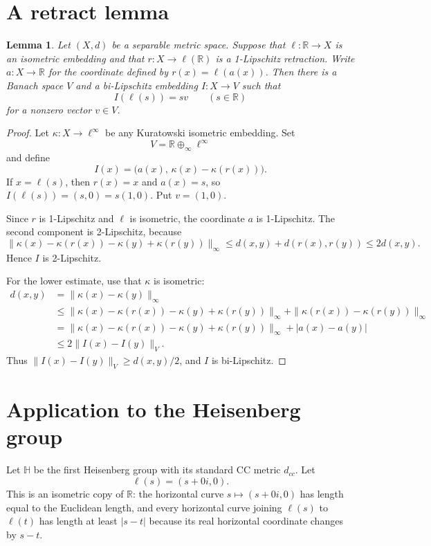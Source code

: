 \documentclass[11pt]{amsart}
\newtheorem{lemma}{Lemma}
\newcommand{\R}{\mathbb R}
\newcommand{\Hh}{\mathbb H}
\newcommand{\ellinf}{\ell^\infty}
\begin{document}
\section*{A retract lemma}

\begin{lemma}
\label{lem:retract}
Let $(X,d)$ be a separable metric space.  Suppose that
$\ell:\R\to X$ is an isometric embedding and that $r:X\to \ell(\R)$ is a
1-Lipschitz retraction.  Write $a:X\to\R$ for the coordinate defined by
$r(x)=\ell(a(x))$.  Then there is a Banach space $V$ and a bi-Lipschitz
embedding $I:X\to V$ such that
\[
 I(\ell(s))=s v
 \qquad (s\in\R)
\]
for a nonzero vector $v\in V$.
\end{lemma}

\begin{proof}
Let $\kappa:X\to\ellinf$ be any Kuratowski isometric embedding.  Set
\[
 V=\R\oplus_\infty \ellinf
\]
and define
\[
 I(x)=\bigl(a(x),\,\kappa(x)-\kappa(r(x))\bigr).
\]
If $x=\ell(s)$, then $r(x)=x$ and $a(x)=s$, so
$I(\ell(s))=(s,0)=s(1,0)$.  Put $v=(1,0)$.

Since $r$ is 1-Lipschitz and $\ell$ is isometric, the coordinate $a$ is
1-Lipschitz.  The second component is 2-Lipschitz, because
\[
 \|\kappa(x)-\kappa(r(x))-\kappa(y)+\kappa(r(y))\|_\infty
 \le d(x,y)+d(r(x),r(y))
 \le 2d(x,y).
\]
Hence $I$ is 2-Lipschitz.

For the lower estimate, use that $\kappa$ is isometric:
\begin{align*}
 d(x,y)
 &=\|\kappa(x)-\kappa(y)\|_\infty\\
 &\le
 \|\kappa(x)-\kappa(r(x))-\kappa(y)+\kappa(r(y))\|_\infty
   +\|\kappa(r(x))-\kappa(r(y))\|_\infty\\
 &=
 \|\kappa(x)-\kappa(r(x))-\kappa(y)+\kappa(r(y))\|_\infty
   +|a(x)-a(y)|\\
 &\le 2\|I(x)-I(y)\|_V.
\end{align*}
Thus $\|I(x)-I(y)\|_V\ge d(x,y)/2$, and $I$ is bi-Lipschitz.
\end{proof}

\section*{Application to the Heisenberg group}

Let $\Hh$ be the first Heisenberg group with its standard CC metric $d_{cc}$.
Let
\[
 \ell(s)=(s+0i,0).
\]
This is an isometric copy of $\R$: the horizontal curve $s\mapsto (s+0i,0)$
has length equal to the Euclidean length, and every horizontal curve joining
$\ell(s)$ to $\ell(t)$ has length at least $|s-t|$ because its real horizontal
coordinate changes by $s-t$.
\end{document}
